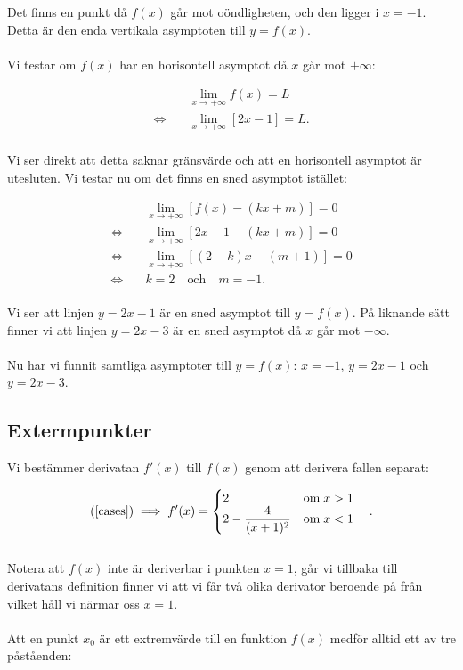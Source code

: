 \documentclass{article}
\begin{document}
\noindent Det finns en punkt då $f(x)$ går mot oöndligheten, och den ligger i $x = -1$. Detta är den enda vertikala asymptoten till $y = f(x)$.
\\
\\
Vi testar om $f(x)$ har en horisontell asymptot då $x$ går mot $+\infty$:

\begin{align*}
  & \lim_{x \to +\infty}f(x) = L\\
  \iff \quad & \lim_{x \to +\infty}[2x - 1] = L\text{.}
\end{align*}
\\
Vi ser direkt att detta saknar gränsvärde och att en horisontell asymptot är utesluten. Vi testar nu om det finns en sned asymptot istället:

\begin{align*}
  & \lim_{x \to +\infty}[f(x) - (kx + m)] = 0\\
  \iff \quad & \lim_{x \to +\infty}[2x - 1 - (kx + m)] = 0\\
  \iff \quad & \lim_{x \to +\infty}[(2 - k)x - (m + 1)] = 0\\
  \iff \quad & k = 2 \quad \text{och} \quad m = -1\text{.}
\end{align*}
\\
Vi ser att linjen $y = 2x - 1$ är en sned asymptot till $y = f(x)$. På liknande sätt finner vi att linjen $y = 2x -3$ är en sned asymptot då $x$ går mot $-\infty$.
\\
\\
Nu har vi funnit samtliga asymptoter till $y = f(x)$: $x = -1$, $y = 2x -1$ och $y = 2x - 3$.


\subsection*{Extermpunkter}

\noindent Vi bestämmer derivatan $f'(x)$ till $f(x)$ genom att derivera fallen separat:

\begin{gather*}
  \text{(\ref{cases})} \implies f'(x) =
  \begin{cases}
    \begin{aligned}[t]
      & 2 & \text{om} \; x > 1 \\
      & 2 - \frac{4}{(x + 1)^{2}} & \text{om} \; x < 1
    \end{aligned}
  \end{cases}\text{.}
\end{gather*}
\\
Notera att $f(x)$ inte är deriverbar i punkten $x = 1$, går vi tillbaka till derivatans definition finner vi att vi får två olika derivator beroende på från vilket håll vi närmar oss $x = 1$.
\\
\\
Att en punkt $x_{0}$ är ett extremvärde till en funktion $f(x)$ medför alltid ett av tre påståenden:
\end{document}
